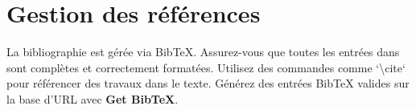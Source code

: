 \section{Gestion des références}
La bibliographie est gérée via BibTeX. Assurez-vous que toutes les entrées dans  sont complètes et correctement formatées. Utilisez des commandes comme `\textbackslash cite` pour référencer des travaux dans le texte. Générez des entrées BibTeX valides sur la base d'URL avec \textbf{Get BibTeX}.\cite{getbibtexBibTeXGenerator}
